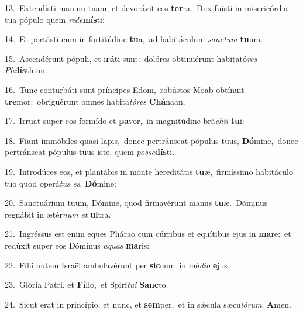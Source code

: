 {\numbfont\textcolor{\numbcolor}{13.}}~Extendísti manum tuam, et devorávit eos \textbf{ter}\-ra.~\star Dux fuísti in misericórdia tua pópulo quem \textit{red}\-\textit{e}\textbf{mís}ti:\par
{\numbfont\textcolor{\numbcolor}{14.}}~Et portásti eum in fortitúdine \textbf{tu}\-a,~\star ad habitáculum \textit{sanc}\-\textit{tum} \textbf{tu}\-um.\par
{\numbfont\textcolor{\numbcolor}{15.}}~Ascendérunt pópuli, et i\-\textbf{rá}\-ti sunt:~\star dolóres obtinuérunt habitató\textit{res} \textit{Phi}\-\textbf{lís}thiim.\par
{\numbfont\textcolor{\numbcolor}{16.}}~Tunc conturbáti sunt príncipes Edom,~\dagger robústos Moab obtínuit \textbf{tre}\-mor:~\star obriguérunt omnes habita\-\textit{tó}\-\textit{res} \textbf{Chá}\-naan.\par
{\numbfont\textcolor{\numbcolor}{17.}}~Irruat super eos formído et \textbf{pa}\-vor,~\star in magnitúdine brá\-\textit{chi}\-\textit{i} \textbf{tu}\-i:\par
{\numbfont\textcolor{\numbcolor}{18.}}~Fiant immóbiles quasi lapis,~\dagger donec pertránseat pópulus tuus, \textbf{Dó}\-mine,~\star donec pertránseat pópulus tuus iste, quem \textit{pos}\-\textit{se}\textbf{dís}ti.\par
{\numbfont\textcolor{\numbcolor}{19.}}~Introdúces eos, et plantábis in monte hereditátis \textbf{tu}\-æ,~\star firmíssimo habitáculo tuo quod operá\textit{tus} \textit{es}\-, \textbf{Dó}\-mine:\par
{\numbfont\textcolor{\numbcolor}{20.}}~Sanctuárium tuum, Dómine, quod firmavérunt manus \textbf{tu}\-æ.~\star Dóminus regnábit in ætér\textit{num} \textit{et} \textbf{ul}\-tra.\par
{\numbfont\textcolor{\numbcolor}{21.}}~Ingréssus est enim eques Phárao cum cúrribus et equítibus ejus in \textbf{ma}\-re:~\star et redúxit super eos Dóminus \textit{a}\-\textit{quas} \textbf{ma}\-ris:\par
{\numbfont\textcolor{\numbcolor}{22.}}~Fílii autem Israël ambulavérunt per \textbf{sic}\-cum~\star in mé\-\textit{di}\-\textit{o} \textbf{e}\-jus.\par
{\numbfont\textcolor{\numbcolor}{23.}}~Glória Patri, et \textbf{Fí}\-lio,~\star et Spirí\-\textit{tu}\-\textit{i} \textbf{Sanc}\-to.\par
{\numbfont\textcolor{\numbcolor}{24.}}~Sicut erat in princípio, et nunc, et \textbf{sem}\-per,~\star et in sǽcula sæcu\-\textit{ló}\-\textit{rum}. \textbf{A}\-men.\par
